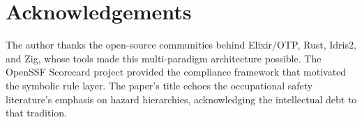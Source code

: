 \documentclass[11pt,a4paper]{article}
\begin{document}
\section*{Acknowledgements}

The author thanks the open-source communities behind Elixir/OTP, Rust, Idris2, and Zig, whose tools made this multi-paradigm architecture possible. The OpenSSF Scorecard project provided the compliance framework that motivated the symbolic rule layer. The paper's title echoes the occupational safety literature's emphasis on hazard hierarchies, acknowledging the intellectual debt to that tradition.



\end{document}
